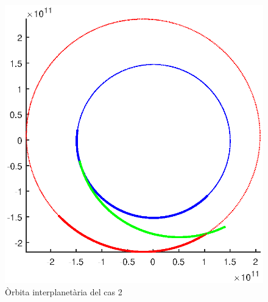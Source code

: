 \begin{figure}[H]
	\centering
	\includegraphics[scale=0.8]{./plots/cas2}
	\caption{Òrbita interplanetària del cas 2}
\end{figure}

